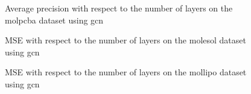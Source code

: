 \begin{figure}
    \centering
    \caption{Average precision with respect to the number of layers on the molpcba dataset using \ac{gcn}}
    \label{fig:layers-prob-gcn-molpcba}
\end{figure}


\begin{figure}
    \centering
    \caption{MSE with respect to the number of layers on the molesol dataset using \ac{gcn}}
    \label{fig:layers-gcn-molesol}
\end{figure}


\begin{figure}
    \centering
    \caption{MSE with respect to the number of layers on the mollipo dataset using \ac{gcn}}
    \label{fig:layers-gcn-mollipo}
\end{figure}




